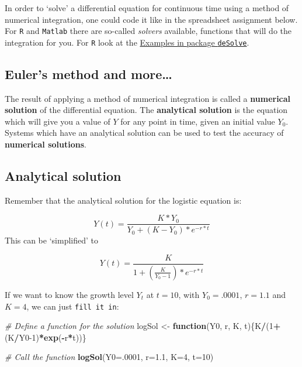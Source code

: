 \documentclass[12pt,]{book}
\newenvironment{Shaded}{\begin{snugshade}}{\end{snugshade}}
\newcommand{\CommentTok}[1]{\textcolor[rgb]{0.56,0.35,0.01}{\textit{#1}}}
\newcommand{\ControlFlowTok}[1]{\textcolor[rgb]{0.13,0.29,0.53}{\textbf{#1}}}
\newcommand{\DataTypeTok}[1]{\textcolor[rgb]{0.13,0.29,0.53}{#1}}
\newcommand{\DecValTok}[1]{\textcolor[rgb]{0.00,0.00,0.81}{#1}}
\newcommand{\FloatTok}[1]{\textcolor[rgb]{0.00,0.00,0.81}{#1}}
\newcommand{\KeywordTok}[1]{\textcolor[rgb]{0.13,0.29,0.53}{\textbf{#1}}}
\newcommand{\NormalTok}[1]{#1}
\newcommand{\OperatorTok}[1]{\textcolor[rgb]{0.81,0.36,0.00}{\textbf{#1}}}
\newcommand{\StringTok}[1]{\textcolor[rgb]{0.31,0.60,0.02}{#1}}
\begin{document}
In order to `solve' a differential equation for continuous time using a method of numerical integration, one could code it like in the spreadsheet assignment below. For \texttt{R} and \texttt{Matlab} there are so-called \emph{solvers} available, functions that will do the integration for you. For \texttt{R} look at the \href{http://desolve.r-forge.r-project.org}{Examples in package \texttt{deSolve}}.

\hypertarget{eulers-method-and-more}{%
\subsection*{Euler's method and more\ldots{}}\label{eulers-method-and-more}}

The result of applying a method of numerical integration is called a \textbf{numerical solution} of the differential equation. The \textbf{analytical solution} is the equation which will give you a value of \(Y\) for any point in time, given an initial value \(Y_0\). Systems which have an analytical solution can be used to test the accuracy of \textbf{numerical solutions}.

\hypertarget{analytical-solution}{%
\subsection*{Analytical solution}\label{analytical-solution}}

Remember that the analytical solution for the logistic equation is:

\[
Y(t)  =  \frac{K * Y_0}{Y_0 + \left(K - Y_0 \right) * e^{-r*t} }
\]
This can be `simplified' to

\[
Y(t)  =  \frac{K}{1 + \left(\frac{K}{Y_0-1} \right) * e^{-r*t} }
\]

If we want to know the growth level \(Y_t\) at \(t=10\), with \(Y_0=.0001\), \(r=1.1\) and \(K=4\), we can just \texttt{fill\ it\ in}:

\begin{Shaded}
\begin{Highlighting}[]
\CommentTok{# Define a function for the solution}
\NormalTok{logSol <-}\StringTok{ }\ControlFlowTok{function}\NormalTok{(Y0, r, K, t)\{K}\OperatorTok{/}\NormalTok{(}\DecValTok{1}\OperatorTok{+}\NormalTok{(K}\OperatorTok{/}\NormalTok{Y0}\DecValTok{-1}\NormalTok{)}\OperatorTok{*}\KeywordTok{exp}\NormalTok{(}\OperatorTok{-}\NormalTok{r}\OperatorTok{*}\NormalTok{t))\}}

\CommentTok{# Call the function}
\KeywordTok{logSol}\NormalTok{(}\DataTypeTok{Y0=}\NormalTok{.}\DecValTok{0001}\NormalTok{, }\DataTypeTok{r=}\FloatTok{1.1}\NormalTok{, }\DataTypeTok{K=}\DecValTok{4}\NormalTok{, }\DataTypeTok{t=}\DecValTok{10}\NormalTok{)}
\end{Highlighting}
\end{Shaded}
\end{document}
